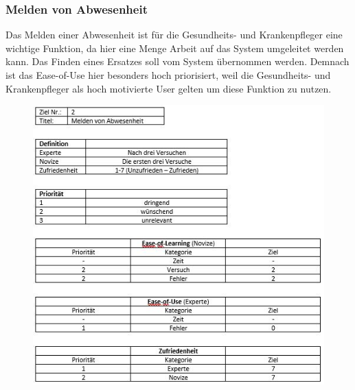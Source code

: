\documentclass[11pt,
paper=a4,
bibtotocnumbered,	  %
liststotocnumbered,  %
DIV=calc,		  %
tablecaptionabove,	  %
headinclude,
]{article}
\begin{document}
\subsubsection{Melden von Abwesenheit}
Das Melden einer Abwesenheit ist für die Gesundheits- und Krankenpfleger eine wichtige Funktion, da hier eine Menge Arbeit auf das System umgeleitet werden kann. Das Finden eines Ersatzes soll vom System übernommen werden. Demnach ist das Ease-of-Use hier besonders hoch priorisiert, weil die Gesundheits- und Krankenpfleger als hoch motivierte User gelten um diese Funktion zu nutzen.
\begin{figure}[H]
\includegraphics[width=1\textwidth]{Bilder/meldenAbwesen.jpg}
\end{figure}
\end{document}
